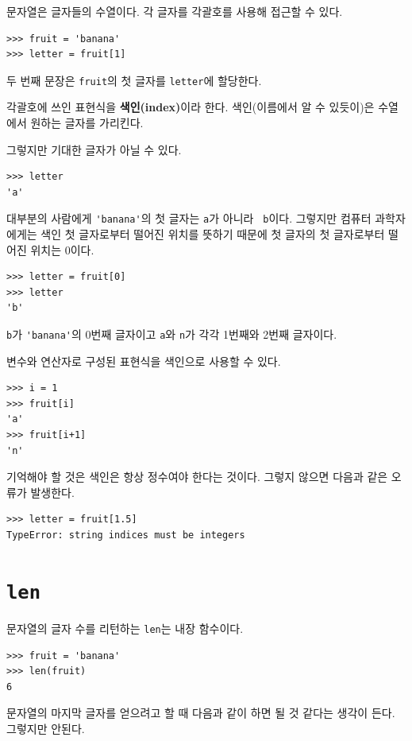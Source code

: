 \documentclass[10pt]{book}
\begin{document}

문자열은 글자들의 수열이다.  각 글자를 각괄호를 사용해 접근할 수 있다. 

\begin{verbatim}
>>> fruit = 'banana'
>>> letter = fruit[1]
\end{verbatim}
%
두 번째 문장은 {\tt fruit}의 첫 글자를 {\tt letter}에 할당한다. 

각괄호에 쓰인 표현식을 {\bf 색인(index)}이라 한다.  색인(이름에서 알 수
있듯이)은 수열에서 원하는 글자를 가리킨다.

그렇지만 기대한 글자가 아닐 수 있다. 

\begin{verbatim}
>>> letter
'a'
\end{verbatim}
%
대부분의 사람에게 \verb"'banana'"의 첫 글자는 {\tt a}가 아니라 {\tt
  b}이다.  그렇지만 컴퓨터 과학자에게는 색인 첫 글자로부터 떨어진
위치를 뜻하기 때문에 첫 글자의 첫 글자로부터 떨어진 위치는 0이다.


\begin{verbatim}
>>> letter = fruit[0]
>>> letter
'b'
\end{verbatim}
%
{\tt b}가 \verb"'banana'"의 0번째 글자이고 {\tt a}와 {\tt n}가 각각
1번째와 2번째 글자이다.
 

변수와 연산자로 구성된 표현식을 색인으로 사용할 수 있다. 

\begin{verbatim}
>>> i = 1
>>> fruit[i]
'a'
>>> fruit[i+1]
'n'
\end{verbatim}
%

기억해야 할 것은 색인은 항상 정수여야 한다는 것이다.  그렇지 않으면
다음과 같은 오류가 발생한다.

\begin{verbatim}
>>> letter = fruit[1.5]
TypeError: string indices must be integers
\end{verbatim}
%

\section{{\tt len}}

문자열의 글자 수를 리턴하는 {\tt len}는 내장 함수이다.

\begin{verbatim}
>>> fruit = 'banana'
>>> len(fruit)
6
\end{verbatim}
%
문자열의 마지막 글자를 얻으려고 할 때 다음과 같이 하면 될 것 같다는 생각이 든다.  그렇지만 안된다. 
\end{document}
